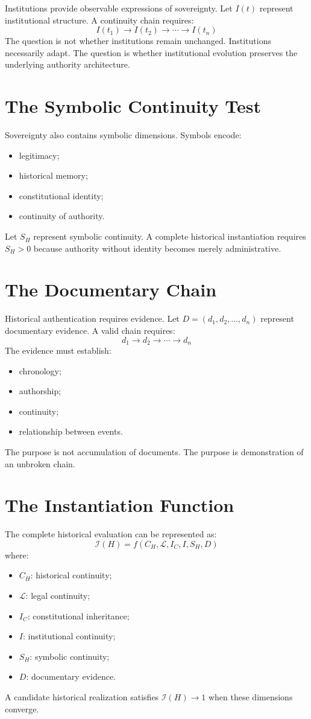 \documentclass[11pt,openany]{book}
\theoremstyle{plain}
\theoremstyle{definition}
\begin{document}
Institutions provide observable expressions of sovereignty. Let \(I(t)\) represent institutional structure. A continuity chain requires:
\[
I(t_1) \longrightarrow I(t_2) \longrightarrow \cdots \longrightarrow I(t_n)
\]
The question is not whether institutions remain unchanged. Institutions necessarily adapt. The question is whether institutional evolution preserves the underlying authority architecture.

\section{The Symbolic Continuity Test}

Sovereignty also contains symbolic dimensions. Symbols encode:
\begin{itemize}
\item legitimacy;
\item historical memory;
\item constitutional identity;
\item continuity of authority.
\end{itemize}
Let \(S_H\) represent symbolic continuity. A complete historical instantiation requires \(S_H > 0\) because authority without identity becomes merely administrative.

\section{The Documentary Chain}

Historical authentication requires evidence. Let \(D = (d_1, d_2, \ldots, d_n)\) represent documentary evidence. A valid chain requires:
\[
d_1 \longrightarrow d_2 \longrightarrow \cdots \longrightarrow d_n
\]
The evidence must establish:
\begin{itemize}
\item chronology;
\item authorship;
\item continuity;
\item relationship between events.
\end{itemize}
The purpose is not accumulation of documents. The purpose is demonstration of an unbroken chain.

\section{The Instantiation Function}

The complete historical evaluation can be represented as:
\[
\mathcal{I}(H) = f(C_H, \mathcal{L}, I_C, I, S_H, D)
\]
where:
\begin{itemize}
\item \(C_H\): historical continuity;
\item \(\mathcal{L}\): legal continuity;
\item \(I_C\): constitutional inheritance;
\item \(I\): institutional continuity;
\item \(S_H\): symbolic continuity;
\item \(D\): documentary evidence.
\end{itemize}
A candidate historical realization satisfies \(\mathcal{I}(H) \to 1\) when these dimensions converge.
\end{document}
